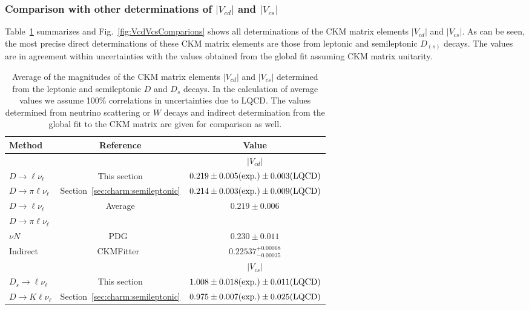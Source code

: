 \subsubsection{Comparison with other determinations of $|V_{cd}|$ and $|V_{cs}|$}

Table~\ref{tab:CKMVcdVcs} summarizes and Fig.~\ref{fig:VcdVcsComparions} shows all determinations of the CKM matrix elements $|V_{cd}|$ and $|V_{cs}|$. As
can be seen, the most precise direct determinations of these CKM matrix elements are those from leptonic and semileptonic $D_{(s)}$ decays. The values are in agreement
within uncertainties with the values obtained from the global fit assuming CKM matrix unitarity.
\begin{table}[htb]
\caption{Average of the magnitudes of the CKM matrix elements $|V_{cd}|$ and $|V_{cs}|$ determined from the leptonic and semileptonic $D$ and $D_s$ decays.
In the calculation of average values we assume 100\% correlations in uncertainties due to LQCD.  The values determined from neutrino scattering 
or $W$ decays and indirect determination from the global fit to the CKM matrix are given for comparison as well.
\label{tab:CKMVcdVcs}}
\begin{center}
\begin{tabular}{lcc}
\toprule
\rowcolor{Gray} Method & Reference & Value \\ 
\midrule
&&{$|V_{cd}|$}\\
\cline{3-3}
$D\to\ell\nu_{\ell}$ 	 & This section			& $0.219\pm0.005(\rm exp.)\pm0.003(\rm LQCD)$\\
$D\to\pi\ell\nu_{\ell}$  & Section~\ref{sec:charm:semileptonic}		& $0.214\pm0.003(\rm exp.)\pm0.009(\rm LQCD)$\\
\midrule
\rowcolor{Gray} $D\to\ell\nu_{\ell}$ 	& \multirow{2}{*}{Average}	& \multirow{2}{*}{$0.219\pm0.006$}\\
\rowcolor{Gray} $D\to\pi\ell\nu_{\ell}$ & \multirow{-2}{*}{Average}	& \multirow{-2}{*}{$0.219\pm0.006$}\\
\midrule
$\nu N$			& PDG~\cite{PDG_2012}	& $0.230\pm0.011$\\
Indirect		& CKMFitter~\cite{Charles:2004jd}		& $0.22537^{+0.00068}_{-0.00035}$\\
\midrule
\midrule
&&{$|V_{cs}|$}\\
\cline{3-3}
$D_s\to\ell\nu_{\ell}$ 	 & This section			& $1.008\pm0.018(\rm exp.)\pm0.011(\rm LQCD)$\\
$D\to K\ell\nu_{\ell}$   & Section~\ref{sec:charm:semileptonic}		& $0.975\pm0.007(\rm exp.)\pm0.025(\rm LQCD)$\\

\end{tabular}
\end{center}
\end{table}

